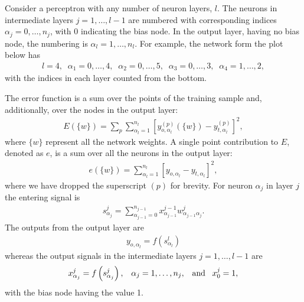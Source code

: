 \documentclass[a4paper,12pt,polish]{jupyterBook}
\begin{document}
\sphinxAtStartPar
Consider a perceptron with any number of neuron layers, \(l\). The neurons in intermediate layers \(j=1,\dots,l-1\) are numbered with corresponding indices \(\alpha_j=0,\dots,n_j\), with 0 indicating the bias node. In the output layer, having no bias node, the numbering is \(\alpha_l=1,\dots,n_l\). For example, the network form the plot below has
\begin{equation*}
\begin{split}l=4,\;\; \alpha_1=0,\dots,4,\;\; \alpha_2=0,\dots,5, \;\; \alpha_3=0,\dots,3, \;\; \alpha_4=1,\dots,2,\end{split}
\end{equation*}
\sphinxAtStartPar
with the indices in each layer counted from the bottom.
\begin{sphinxVerbatimOutput}

\noindent{}
\end{sphinxVerbatimOutput}

\sphinxAtStartPar
The error function is a sum over the points of the training sample and, additionally, over the nodes in the output layer:
\begin{equation*}
\begin{split}
E(\{w\})=\sum_p \sum_{\alpha_l=1}^{n_l} \left[ y_{o,{\alpha_l}}^{(p)}(\{w\})-y_{t,{\alpha_l}}^{(p)}\right]^2,
\end{split}
\end{equation*}
\sphinxAtStartPar
where \( \{w \} \) represent all the network weights.
A single point contribution to \(E\), denoted as \( e \), is
a sum over all the neurons in the output layer:
\begin{equation*}
\begin{split}
e(\{w\})= \sum_{{\alpha_l}=1}^{n_l}\left[ y_{o,{\alpha_l}}-y_{t,{\alpha_l}}\right]^2, 
\end{split}
\end{equation*}
\sphinxAtStartPar
where we have dropped the superscript \((p)\) for brevity.
For neuron \(\alpha_j\) in layer \(j\) the entering signal is
\begin{equation*}
\begin{split}
s_{\alpha_j}^{j}=\sum_{\alpha_{j-1}=0}^{n_{j-1}} x_{\alpha_{j-1}}^{j-1} w_{\alpha_{j-1} \alpha_j}^{j}.
\end{split}
\end{equation*}
\sphinxAtStartPar
The outputs from the output layer are
\begin{equation*}
\begin{split}
y_{o,{\alpha_l}}=f\left( s_{\alpha_l}^{l} \right)
\end{split}
\end{equation*}
\sphinxAtStartPar
whereas the output signals in the intermediate layers \(j=1,\dots,l-1\) are
\begin{equation*}
\begin{split}
x_{\alpha_j}^{j}=f \left ( s_{\alpha_j}^{j}\right ),\;\;\;\alpha_{j}=1,\dots,n_j, \;\;\; {\rm and} \;\;\; x_0^{j}=1,
\end{split}
\end{equation*}
\sphinxAtStartPar
with the bias node having the value 1.
\end{document}
